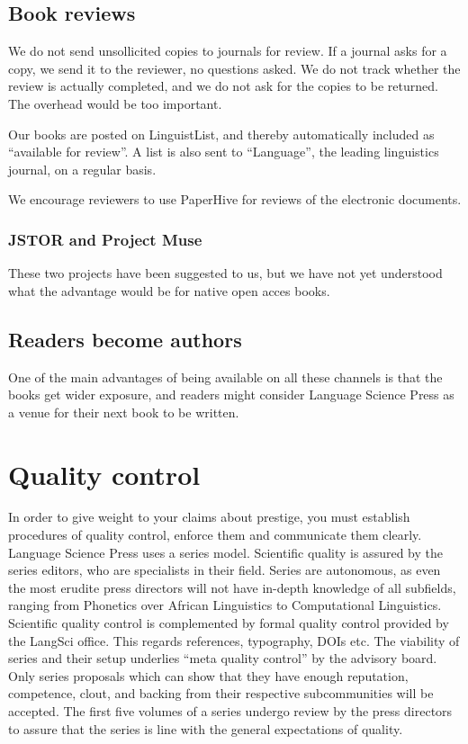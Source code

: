 \documentclass[guidelines,nonflat,modfonts] {langsci/langscibook}
\begin{document}
\subsection{Book reviews}
We do not send unsollicited copies to journals for review. If a journal asks for a copy, we send it to the reviewer, no questions asked. We do not track whether the review is actually completed, and we do not ask for the copies to be returned. The overhead would be too important. 

Our books are posted on LinguistList, and thereby automatically included as ``available for review''. A list is also sent to ``Language'', the leading linguistics journal, on a regular basis. 

We encourage reviewers to use PaperHive for reviews of the electronic documents.

                      
\subsubsection{JSTOR and Project Muse}                      
These two projects have been suggested to us, but we have not yet understood what the advantage would be for native open acces books.


\subsection{Readers become authors}
One of the main advantages of being available on all these channels is that the books get wider exposure, and readers might consider Language Science Press as a venue for their next book to be written. %

\section{Quality control}
In order to give weight to your claims about prestige, you must establish procedures of quality control, enforce them and communicate them clearly. Language Science Press uses a series model. Scientific quality is assured by the series editors, who are specialists in their field. Series are autonomous, as even the most erudite press directors will not have in-depth knowledge of all subfields, ranging from Phonetics over African Linguistics to Computational Linguistics. Scientific quality control is complemented by formal quality control provided by the LangSci office. This regards references, typography, DOIs etc. The viability of series and their setup underlies ``meta quality control'' by the advisory board. Only series proposals which can show that they have enough reputation, competence, clout, and backing from their respective subcommunities will be accepted. The first five volumes of a series undergo review by the press directors to assure that the series is line with the general expectations of quality.
                    
\end{document}
